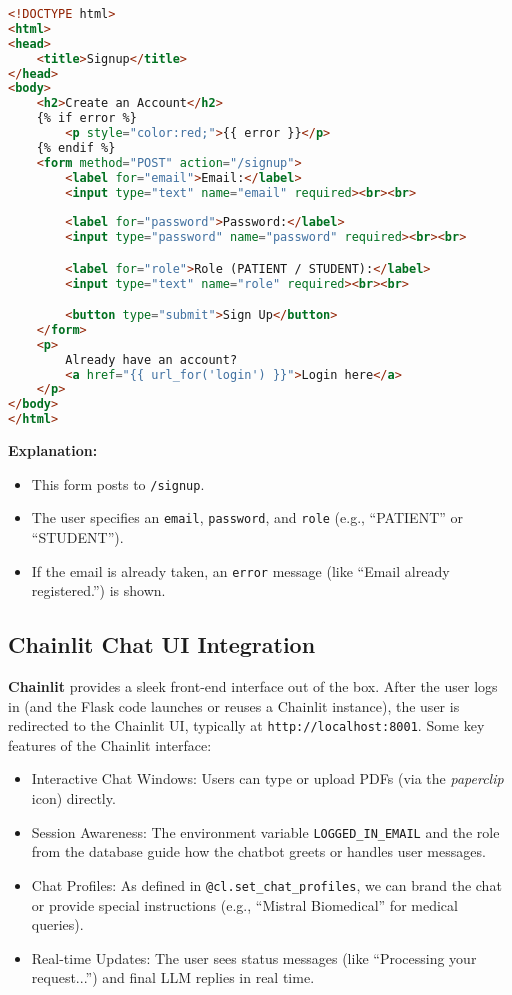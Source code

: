 \begin{lstlisting}[language=HTML, caption={signup.html (Flask Template)}, basicstyle=\small\ttfamily]
<!DOCTYPE html>
<html>
<head>
    <title>Signup</title>
</head>
<body>
    <h2>Create an Account</h2>
    {% if error %}
        <p style="color:red;">{{ error }}</p>
    {% endif %}
    <form method="POST" action="/signup">
        <label for="email">Email:</label>
        <input type="text" name="email" required><br><br>
        
        <label for="password">Password:</label>
        <input type="password" name="password" required><br><br>

        <label for="role">Role (PATIENT / STUDENT):</label>
        <input type="text" name="role" required><br><br>

        <button type="submit">Sign Up</button>
    </form>
    <p>
        Already have an account? 
        <a href="{{ url_for('login') }}">Login here</a>
    </p>
</body>
</html>
\end{lstlisting}

\noindent\textbf{Explanation:}
\begin{itemize}
    \item This form posts to \texttt{/signup}.
    \item The user specifies an \texttt{email}, \texttt{password}, and \texttt{role} (e.g., “PATIENT” or “STUDENT”).
    \item If the email is already taken, an \texttt{error} message (like ``Email already registered.'') is shown.
\end{itemize}

\subsection{Chainlit Chat UI Integration}

\textbf{Chainlit} provides a sleek front-end interface out of the box. After the user logs in (and the Flask code launches or reuses a Chainlit instance), the user is redirected to the Chainlit UI, typically at \texttt{http://localhost:8001}. Some key features of the Chainlit interface:

\begin{itemize}
    \item Interactive Chat Windows: Users can type or upload PDFs (via the \emph{paperclip} icon) directly. 
    \item Session Awareness: The environment variable \texttt{LOGGED\_IN\_EMAIL} and the role from the database guide how the chatbot greets or handles user messages.
    \item Chat Profiles: As defined in \texttt{@cl.set\_chat\_profiles}, we can brand the chat or provide special instructions (e.g., “Mistral Biomedical” for medical queries).
    \item Real-time Updates: The user sees status messages (like “Processing your request...”) and final LLM replies in real time.
\end{itemize}

